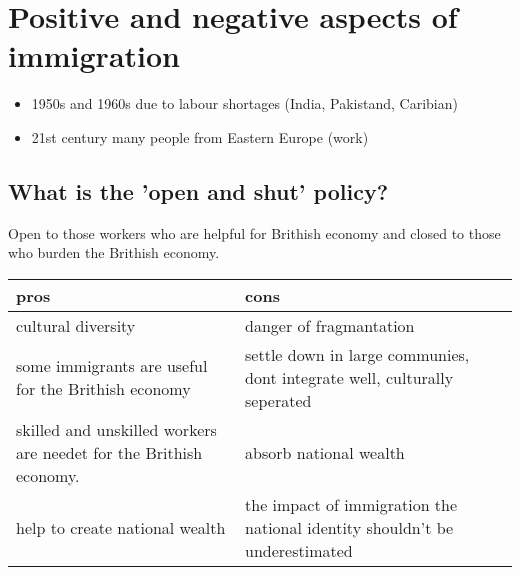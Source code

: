 \documentclass{article}
\begin{document}
\section*{Positive and negative aspects of immigration}

\begin{itemize}

\item 1950s and 1960s due to labour shortages (India, Pakistand, Caribian)
\item 21st century many people from Eastern Europe (work) 

\end{itemize}

\subsection*{What is the 'open and shut' policy?}

Open to those workers who are helpful for Brithish economy and closed to those who burden the Brithish economy.

\renewcommand{\arraystretch}{2}
\begin{tabular}[h]{p{6cm}|p{6cm}}
pros & cons \\
\hline
cultural diversity & danger of fragmantation \\
some immigrants are useful for the Brithish economy & settle down in large communies, dont integrate well, culturally seperated \\
skilled and  unskilled workers are needet for the Brithish economy. & absorb national wealth \\
help to create national wealth & the impact of immigration the national identity shouldn't be underestimated \\
\end{tabular}
\end{document}
